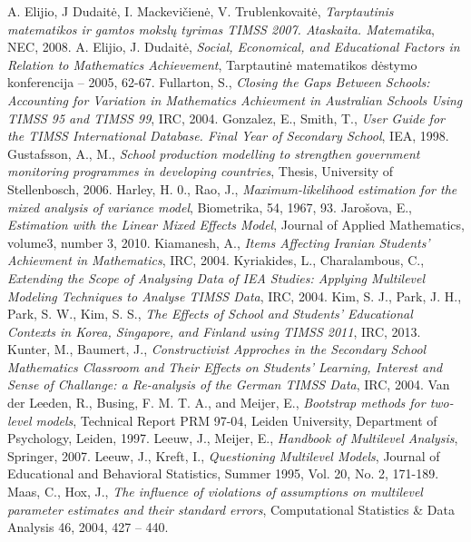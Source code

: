\documentclass[12pt,a4paper]{article}
\begin{document}
\begin{thebibliography}{1}
 A. Elijio, J Dudaitė, I. Mackevičienė, V. Trublenkovaitė, \textit{Tarptautinis matematikos ir gamtos mokslų tyrimas TIMSS 2007. Ataskaita. Matematika}, NEC, 2008.
 A. Elijio, J. Dudaitė, \textit{Social, Economical, and Educational Factors in Relation to Mathematics Achievement}, Tarptautinė matematikos dėstymo konferencija – 2005, 62-67.
 Fullarton, S., \textit{Closing the Gaps Between Schools: Accounting for Variation in Mathematics Achievment in Australian Schools Using TIMSS 95 and TIMSS 99}, IRC, 2004.
 Gonzalez, E., Smith, T., \textit{User Guide for the TIMSS International Database. Final Year of Secondary School}, IEA, 1998.
 Gustafsson, A., M., \textit{School production modelling to strengthen government monitoring programmes in developing countries}, Thesis, University of Stellenbosch, 2006.
 Harley, H. 0., Rao, J., \textit{Maximum-likelihood estimation for the mixed analysis of variance model}, Biometrika, 54, 1967, 93.
 Jarošova, E., \textit{Estimation with the Linear Mixed Effects Model}, Journal of Applied Mathematics, volume3, number 3, 2010.
 Kiamanesh, A., \textit{Items Affecting Iranian Students' Achievment in Mathematics}, IRC, 2004.
 Kyriakides, L., Charalambous, C., \textit{ Extending the Scope of Analysing Data of IEA Studies: Applying Multilevel Modeling Techniques to Analyse TIMSS Data}, IRC, 2004.
 Kim, S. J., Park, J. H., Park, S. W., Kim, S. S., \textit{The Effects of School and Students’ Educational Contexts in Korea, Singapore, and Finland using TIMSS 2011}, IRC, 2013.
 Kunter, M., Baumert, J., \textit{Constructivist Approches in the Secondary School Mathematics Classroom and Their Effects on Students' Learning, Interest and Sense of Challange: a Re-analysis of the German TIMSS Data}, IRC, 2004.
 Van der Leeden, R., Busing, F. M. T. A., and Meijer, E., \textit{Bootstrap methods for two-level models}, Technical Report PRM 97-04, Leiden University, Department of Psychology, Leiden, 1997.
 Leeuw, J., Meijer, E., \textit{Handbook of Multilevel Analysis}, Springer, 2007.
 Leeuw, J., Kreft, I., \textit{Questioning Multilevel Models}, Journal of Educational and Behavioral Statistics, Summer 1995, Vol. 20, No. 2, 171-189.
 Maas, C., Hox, J., \textit{The influence of violations of assumptions on multilevel parameter estimates and their standard errors}, Computational Statistics \& Data Analysis 46, 2004, 427 – 440.

\end{thebibliography}
\end{document}
